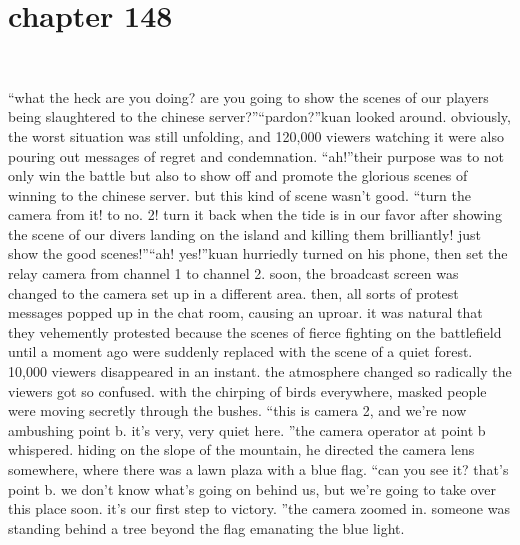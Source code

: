 \section{chapter 148}

                             




“what the heck are you doing? are you going to show the scenes of our players being slaughtered to the chinese server?”“pardon?”kuan looked around.
 obviously, the worst situation was still unfolding, and 120,000 viewers watching it were also pouring out messages of regret and condemnation.
“ah!”their purpose was to not only win the battle but also to show off and promote the glorious scenes of winning to the chinese server.
 but this kind of scene wasn’t good.
“turn the camera from it! to no.
 2! turn it back when the tide is in our favor after showing the scene of our divers landing on the island and killing them brilliantly! just show the good scenes!”“ah! yes!”kuan hurriedly turned on his phone, then set the relay camera from channel 1 to channel 2.
soon, the broadcast screen was changed to the camera set up in a different area.
then, all sorts of protest messages popped up in the chat room, causing an uproar.
 it was natural that they vehemently protested because the scenes of fierce fighting on the battlefield until a moment ago were suddenly replaced with the scene of a quiet forest.
 10,000 viewers disappeared in an instant.
the atmosphere changed so radically the viewers got so confused.
 with the chirping of birds everywhere, masked people were moving secretly through the bushes.
“this is camera 2, and we’re now ambushing point b.
 it’s very, very quiet here.
”the camera operator at point b whispered.
 hiding on the slope of the mountain, he directed the camera lens somewhere, where there was a lawn plaza with a blue flag.
“can you see it? that’s point b.
 we don’t know what’s going on behind us, but we’re going to take over this place soon.
 it’s our first step to victory.
”the camera zoomed in.
 someone was standing behind a tree beyond the flag emanating the blue light.

